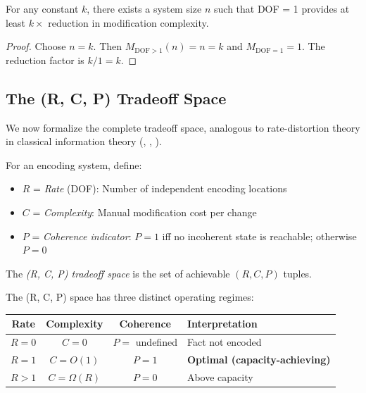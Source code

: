 \begin{corollary}\label{cor:arbitrary-reduction}
For any constant $k$, there exists a system size $n$ such that DOF = 1 provides at least $k\times$ reduction in modification complexity.
\end{corollary}

\begin{proof}
Choose $n = k$. Then $M_{\text{DOF}>1}(n) = n = k$ and $M_{\text{DOF}=1} = 1$. The reduction factor is $k/1 = k$.
\end{proof}

\subsection{The (R, C, P) Tradeoff Space}\label{sec:rcp-tradeoff}

We now formalize the complete tradeoff space, analogous to rate-distortion theory in classical information theory (, , ).

\begin{definition}[(R, C, P) Tradeoff]\label{def:rcp-tradeoff}
For an encoding system, define:
\begin{itemize}
\tightlist
\item $R$ = \emph{Rate} (DOF): Number of independent encoding locations
\item $C$ = \emph{Complexity}: Manual modification cost per change
\item $P$ = \emph{Coherence indicator}: $P = 1$ iff no incoherent state is reachable; otherwise $P = 0$
\end{itemize}
The \emph{(R, C, P) tradeoff space} is the set of achievable $(R, C, P)$ tuples.
\end{definition}

\begin{theorem}\label{thm:operating-regimes}
The (R, C, P) space has three distinct operating regimes:
\begin{center}
\begin{tabularx}{\linewidth}{cccY}
\toprule
\textbf{Rate} & \textbf{Complexity} & \textbf{Coherence} & \textbf{Interpretation} \\
\midrule
$R = 0$ & $C = 0$ & $P = $ undefined & Fact not encoded \\
$R = 1$ & $C = O(1)$ & $P = 1$ & \textbf{Optimal (capacity-achieving)} \\
$R > 1$ & $C = \Omega(R)$ & $P = 0$ & Above capacity \\
\bottomrule
\end{tabularx}
\end{center}
\end{theorem}


